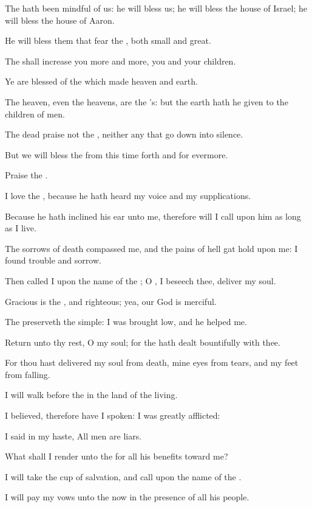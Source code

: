 \Verse The \LORD hath been mindful of us: he will bless us; he will bless the house of Israel; he will bless the house of Aaron.

\Verse He will bless them that fear the \LORD, both small and great.

\Verse The \LORD shall increase you more and more, you and your children.

\Verse Ye are blessed of the \LORD which made heaven and earth.

\Verse The heaven, even the heavens, are the \LORD's: but the earth hath he given to the children of men.

\Verse The dead praise not the \LORD, neither any that go down into silence.

\Verse But we will bless the \LORD from this time forth and for evermore.

Praise the \LORD.




\Chapter
\Verse I love the \LORD, because he hath heard my voice and my supplications.

\Verse Because he hath inclined his ear unto me, therefore will I call upon him as long as I live.

\Verse The sorrows of death compassed me, and the pains of hell gat hold upon me: I found trouble and sorrow.

\Verse Then called I upon the name of the \LORD; O \LORD, I beseech thee, deliver my soul.

\Verse Gracious is the \LORD, and righteous; yea, our God is merciful.

\Verse The \LORD preserveth the simple: I was brought low, and he helped me.

\Verse Return unto thy rest, O my soul; for the \LORD hath dealt bountifully with thee.

\Verse For thou hast delivered my soul from death, mine eyes from tears, and my feet from falling.

\Verse I will walk before the \LORD in the land of the living.

\Verse I believed, therefore have I spoken: I was greatly afflicted:

\Verse I said in my haste, All men are liars.

\Verse What shall I render unto the \LORD for all his benefits toward me?

\Verse I will take the cup of salvation, and call upon the name of the \LORD.

\Verse I will pay my vows unto the \LORD now in the presence of all his people.

